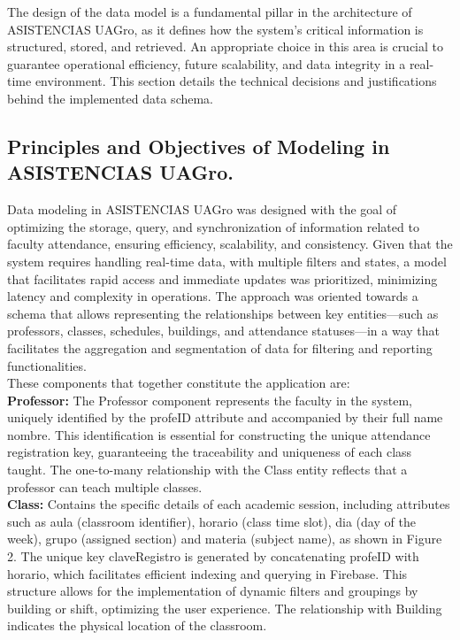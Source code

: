 \documentclass[journal=information,article,submit,pdftex,oneauthor]{Definitions/mdpi}
\begin{document}
	The design of the data model is a fundamental pillar in the architecture of ASISTENCIAS UAGro, as it defines how the system's critical information is structured, stored, and retrieved. An appropriate choice in this area is crucial to guarantee operational efficiency, future scalability, and data integrity in a real-time environment. This section details the technical decisions and justifications behind the implemented data schema.
	
	\subsection{Principles and Objectives of Modeling in ASISTENCIAS UAGro.}
	
	Data modeling in ASISTENCIAS UAGro was designed with the goal of optimizing the storage, query, and synchronization of information related to faculty attendance, ensuring efficiency, scalability, and consistency. Given that the system requires handling real-time data, with multiple filters and states, a model that facilitates rapid access and immediate updates was prioritized, minimizing latency and complexity in operations. The approach was oriented towards a schema that allows representing the relationships between key entities—such as professors, classes, schedules, buildings, and attendance statuses—in a way that facilitates the aggregation and segmentation of data for filtering and reporting functionalities.\\
	
	These components that together constitute the application are:\\
	
	\textbf{Professor:} The Professor component represents the faculty in the system, uniquely identified by the profeID attribute and accompanied by their full name nombre. This identification is essential for constructing the unique attendance registration key, guaranteeing the traceability and uniqueness of each class taught. The one-to-many relationship with the Class entity reflects that a professor can teach multiple classes.\\
	
	\textbf{Class:} Contains the specific details of each academic session, including attributes such as aula (classroom identifier), horario (class time slot), dia (day of the week), grupo (assigned section) and materia (subject name), as shown in Figure 2. The unique key claveRegistro is generated by concatenating profeID with horario, which facilitates efficient indexing and querying in Firebase. This structure allows for the implementation of dynamic filters and groupings by building or shift, optimizing the user experience. The relationship with Building indicates the physical location of the classroom.\\
	
\end{document}
